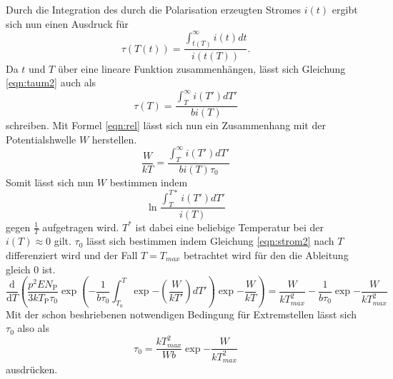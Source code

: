 Durch die Integration des durch die Polarisation erzeugten Stromes $i(t)$
ergibt sich nun einen Ausdruck für
\begin{equation}
  \tau(T(t))=\frac{\int_{t(T)}^{\infty} i(t) dt}{i(t(T))} .
  \label{eqn:taum2}
\end{equation}
Da $t$ und $T$ über eine lineare Funktion zusammenhängen, lässt sich Gleichung \ref{eqn:taum2} auch als
\begin{equation}
  \tau(T)=\frac{\int_{T}^{\infty}i(T')dT'}{bi(T)}
\end{equation}
schreiben. Mit Formel \ref{eqn:rel} lässt sich nun ein Zusammenhang mit
der Potentialshwelle $W$ herstellen.
\begin{equation}
  \frac{W}{kT}=\frac{\int_{T}^{\infty}i(T')dT'}{bi(T)\tau_{0}}
  \label{eqn:strom2}
\end{equation}
Somit lässt sich nun $W$ bestimmen indem
\begin{equation}
  \ln \frac{\int_{T}^{T*}i(T')dT'}{i(T)}
\end{equation}
gegen $\frac{1}{T}$ aufgetragen wird. $T^*$ ist dabei eine beliebige Temperatur
bei der $i(T) \approx 0$ gilt.
  $\tau_{0}$ lässt sich bestimmen indem Gleichung \ref{eqn:strom2} nach $T$ differenziert wird und
 der Fall $T=T_{max}$ betrachtet wird für den die Ableitung gleich 0 ist.
 \begin{equation}
   \frac{\text{d}}{\text{d}T} \left( \frac{p^{2}EN_{\text{P}}}{3kT_{\text{P}}\tau_{0}} \exp{\left(-\frac{1}{b\tau_{0}}\int_{T_{0}}^{T}\exp{-(\frac{W}{kT'})dT'}\right)}\exp{-\frac{W}{kT}} \right)= \frac{W}{kT_{max}^{2}}-\frac{1}{b\tau_{0}}\exp{-\frac{W}{kT_{max}^2}}
 \end{equation}
 Mit der schon beshriebenen notwendigen Bedingung für Extremstellen
 lässt sich $\tau_{0}$ also als
 \begin{equation}
   \tau_{0}=\frac{kT_{max}^{2}}{Wb} \exp{-\frac{W}{kT_{max}^2}}
   \label{eqn:tau}
 \end{equation}
 ausdrücken.
